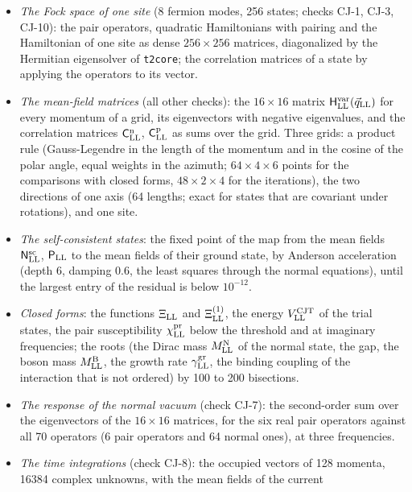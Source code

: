 \documentclass[
  10pt,
]{article}
\begin{document}
\begin{itemize}
\item
  \emph{The Fock space of one site} (8 fermion modes, 256 states; checks
  CJ-1, CJ-3, CJ-10): the pair operators, quadratic Hamiltonians with
  pairing and the Hamiltonian of one site as dense \(256\times256\)
  matrices, diagonalized by the Hermitian eigensolver of
  \texttt{t2core}; the correlation matrices of a state by applying the
  operators to its vector.
\item
  \emph{The mean-field matrices} (all other checks): the \(16\times16\)
  matrix \(\mathsf H^{\rm var}_{\rm LL}(\vec q_{\rm LL})\) for every
  momentum of a grid, its eigenvectors with negative eigenvalues, and
  the correlation matrices \(\mathsf C^{\rm n}_{\rm LL}\),
  \(\mathsf C^{\rm p}_{\rm LL}\) as sums over the grid. Three grids: a
  product rule (Gauss-Legendre in the length of the momentum and in the
  cosine of the polar angle, equal weights in the azimuth;
  \(64\times4\times6\) points for the comparisons with closed forms,
  \(48\times2\times4\) for the iterations), the two directions of one
  axis (64 lengths; exact for states that are covariant under
  rotations), and one site.
\item
  \emph{The self-consistent states}: the fixed point of the map from the
  mean fields \(\mathsf N^{\rm sc}_{\rm LL}\), \(\mathsf P_{\rm LL}\) to
  the mean fields of their ground state, by Anderson acceleration (depth
  6, damping 0.6, the least squares through the normal equations), until
  the largest entry of the residual is below \(10^{-12}\).
\item
  \emph{Closed forms}: the functions \(\Xi_{\rm LL}\) and
  \(\Xi^{(1)}_{\rm LL}\), the energy \(V^{\rm CJT}_{\rm LL}\) of the
  trial states, the pair susceptibility \(\chi^{\rm pr}_{\rm LL}\) below
  the threshold and at imaginary frequencies; the roots (the Dirac mass
  \(M^{\rm N}_{\rm LL}\) of the normal state, the gap, the boson mass
  \(M^{\rm B}_{\rm LL}\), the growth rate \(\gamma^{\rm gr}_{\rm LL}\),
  the binding coupling of the interaction that is not ordered) by 100 to
  200 bisections.
\item
  \emph{The response of the normal vacuum} (check CJ-7): the
  second-order sum over the eigenvectors of the \(16\times16\) matrices,
  for the six real pair operators against all 70 operators (6 pair
  operators and 64 normal ones), at three frequencies.
\item
  \emph{The time integrations} (check CJ-8): the occupied vectors of 128
  momenta, 16384 complex unknowns, with the mean fields of the current

\end{itemize}
\end{document}
